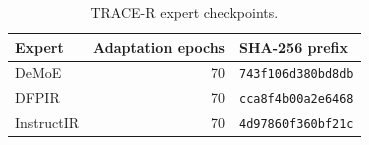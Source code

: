 \begin{table}[!t]
\centering
\caption{TRACE-R expert checkpoints.}
\label{tab:checkpoints}
\footnotesize
\setlength{\tabcolsep}{3.7pt}
\begin{tabular}{lrl}
\toprule
Expert & Adaptation epochs & SHA-256 prefix \\
\midrule
DeMoE & 70 & \texttt{743f106d380bd8db} \\
DFPIR & 70 & \texttt{cca8f4b00a2e6468} \\
InstructIR & 70 & \texttt{4d97860f360bf21c} \\
\bottomrule
\end{tabular}
\end{table}
